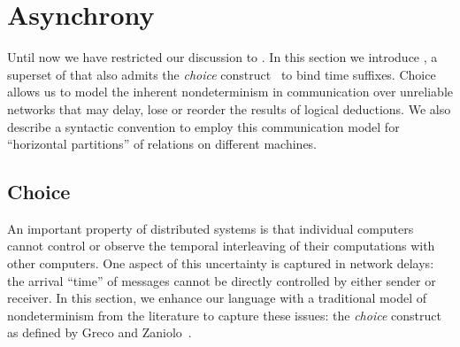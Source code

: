 \section{Asynchrony}
\label{sec:async}

%    

Until now we have restricted our discussion to \slang.  In this section we
introduce \lang, a superset of \slang that also admits the \emph{choice} construct~\cite{greedychoice} to bind time suffixes.
Choice allows us to model the inherent nondeterminism in communication over unreliable
networks that may delay, lose or reorder the results of logical deductions. 
We also describe a syntactic convention to employ this communication model for ``horizontal partitions'' of relations on different machines.


\subsection{Choice}



An important property of distributed systems is that individual computers cannot control or observe the temporal interleaving of their computations with other computers.  One aspect of this uncertainty is captured in network delays: the arrival ``time'' of messages cannot be directly controlled by either sender or receiver.  In this section, we enhance our language with a traditional model of nondeterminism from the literature to capture these issues: the \emph{choice} construct as defined by Greco and Zaniolo~\cite{greedychoice}.

